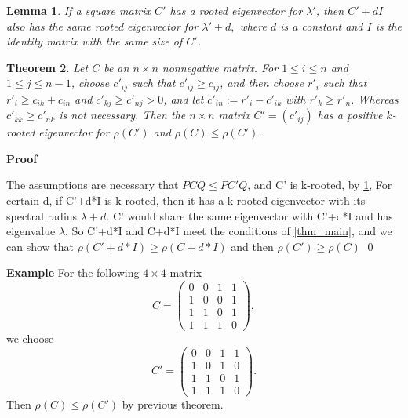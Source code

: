 \documentclass{beamer}
\theoremstyle{plain}
\newtheorem{thm}{Theorem}[section]
\newtheorem{lem}[thm]{Lemma}
\theoremstyle{definition}
\begin{document}
\begin{frame}

\begin{lem}\label{l_diag}
If a square matrix $C'$ has a rooted eigenvector for $\lambda'$, then $C'+dI$ also has
the same rooted eigenvector for $\lambda'+d,$ where $d$ is a constant and $I$ is the identity matrix with the same size of $C'$.
\end{lem}

\end{frame}

\begin{frame}

\begin{thm}
Let $C$ be an $n\times n$ nonnegative matrix. For $1\leq i \leq n$ and $1\leq j\leq n-1$, choose $c'_{ij}$
such that $c'_{ij}\geq c_{ij}$, and then choose $r'_i$ such that $r'_i\geq c_{ik}+c_{in}$ and $c'_{kj}\geq c'_{nj}>0$, and 
let $c'_{in}:=r'_i-c'_{ik}$ with $r'_k \geq r'_n$. Whereas $c'_{kk}\geq c'_{nk}$ is not necessary. Then the $n\times n$ matrix $C'=(c'_{ij})$ has a positive $k$-rooted eigenvector for $\rho(C')$ and $\rho(C)\leq \rho(C')$. 
\end{thm}

\end{frame}

\begin{frame}{\bf Proof}

The assumptions are necessary that $PCQ \leq PC'Q$, and C' is k-rooted, by \ref{l_diag}, For certain d, if C'+d*I is k-rooted, then it has a k-rooted eigenvector with its spectral radius $\lambda + d$. C' would share the same eigenvector with C'+d*I and has eigenvalue $\lambda$. So C'+d*I and C+d*I meet the conditions of \ref{thm_main}, and we can show that $\rho(C' + d*I) \geq \rho(C +d*I)$ and then $\rho(C') \geq \rho(C)$  \qed

\end{frame}

\begin{frame}{\bf Example}
For the following $4\times 4$ matrix
$$C=\begin{pmatrix}
0 & 0 & 1 & 1\\
1 & 0 & 0 & 1\\
1 & 1 & 0 & 1\\
1 & 1 & 1 & 0
\end{pmatrix},$$
we choose
$$C'=\begin{pmatrix}
0 & 0 & 1 & 1\\
1 & 0 & 1 &  0\\
1 & 1 & 0 & 1\\
1 & 1 & 1 & 0
\end{pmatrix}.$$
Then
$\rho(C)\leq \rho(C')$ by previous theorem.
\end{frame}
\end{document}
